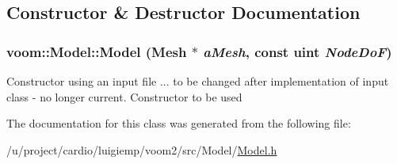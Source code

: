 \subsection{Constructor \& Destructor Documentation}
\hypertarget{classvoom_1_1_model_aa9d7f41277483cb4141fcbb7556871a6}{
\subsubsection[{Model}]{\setlength{\rightskip}{0pt plus 5cm}voom::Model::Model ({\bf Mesh} $\ast$ {\em aMesh}, \/  const uint {\em NodeDoF})}}
\label{classvoom_1_1_model_aa9d7f41277483cb4141fcbb7556871a6}


Constructor using an input file ... to be changed after implementation of input class -\/ no longer current. Constructor to be used 

The documentation for this class was generated from the following file:\begin{DoxyCompactItemize}
\item 
/u/project/cardio/luigiemp/voom2/src/Model/\hyperlink{_model_8h}{Model.h}\end{DoxyCompactItemize}
